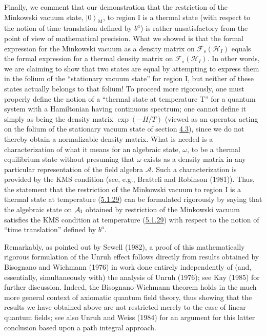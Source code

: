 \documentclass[11pt,a4paper]{article}
\providecommand{\ket}[1]{\left\lvert#1\right\rangle}
\begin{document}
Finally, we comment that our demonstration that the restriction of the Minkowski vacuum state, \(\ket{0}_{\mathrm{M}}\), to region I is a thermal state (with respect to the notion of time translation defined by \(b^a\)) is rather unsatisfactory from the point of view of mathematical precision. What we showed is that the formal expression for the Minkowski vacuum as a density matrix on \(\mathcal{F}_s(\mathcal{H}_I)\) equals the formal expression for a thermal density matrix on \(\mathcal{F}_s(\mathcal{H}_I)\). In other words, we are claiming to show that two states are equal by attempting to express them in the folium of the ``stationary vacuum state'' for region I, but neither of these states actually belongs to that folium! To proceed more rigorously, one must properly define the notion of a ``thermal state at temperature T'' for a quantum system with a Hamiltonian having continuous spectrum; one cannot define it simply \hypertarget{source-131}{} as being the density matrix \(\exp(-H/T)\) (viewed as an operator acting on the folium of the stationary vacuum state of section \hyperlink{sec:4.3}{4.3}), since we do not thereby obtain a normalizable density matrix. What is needed is a characterization of what it means for an algebraic state, \(\omega\), to be a thermal equilibrium state without presuming that \(\omega\) exists as a density matrix in any particular representation of the field algebra \(\mathcal{A}\). Such a characterization is provided by the KMS condition (see, e.g., Bratteli and Robinson (1981)). Thus, the statement that the restriction of the Minkowski vacuum to region I is a thermal state at temperature (\hyperref[eq:5.1.29]{5.1.29}) can be formulated rigorously by saying that the algebraic state on \(\mathcal{A}_{\rm I}\) obtained by restriction of the Minkowski vacuum satisfies the KMS condition at temperature (\hyperref[eq:5.1.29]{5.1.29}) with respect to the notion of ``time translation'' defined by \(b^a\).

Remarkably, as pointed out by Sewell (1982), a proof of this mathematically rigorous formulation of the Unruh effect follows directly from results obtained by Bisognano and Wichmann (1976) in work done entirely independently of (and, essentially, simultaneously with) the analysis of Unruh (1976); see Kay (1985) for further discussion. Indeed, the Bisognano-Wichmann theorem holds in the much more general context of axiomatic quantum field theory, thus showing that the results we have obtained above are not restricted merely to the case of linear quantum fields; see also Unruh and Weiss (1984) for an argument for this latter conclusion based upon a path integral approach.
\end{document}
